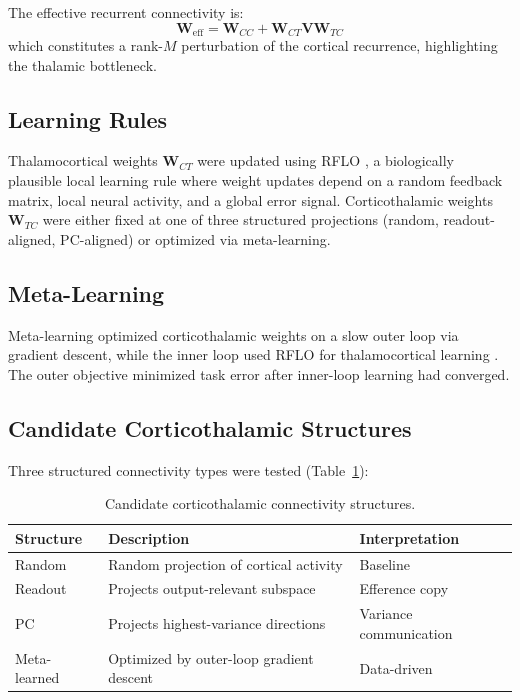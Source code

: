 \documentclass[11pt]{article}
\begin{document}
The effective recurrent connectivity is:
\begin{equation}
\mathbf{W}_{\text{eff}} = \mathbf{W}_{CC} + \mathbf{W}_{CT} \mathbf{V} \mathbf{W}_{TC}
\end{equation}
which constitutes a rank-$M$ perturbation of the cortical recurrence, highlighting the thalamic bottleneck.

\subsection{Learning Rules}

Thalamocortical weights $\mathbf{W}_{CT}$ were updated using RFLO \citep{lillicrap2016rflo}, a biologically plausible local learning rule where weight updates depend on a random feedback matrix, local neural activity, and a global error signal. Corticothalamic weights $\mathbf{W}_{TC}$ were either fixed at one of three structured projections (random, readout-aligned, PC-aligned) or optimized via meta-learning.

\subsection{Meta-Learning}

Meta-learning optimized corticothalamic weights on a slow outer loop via gradient descent, while the inner loop used RFLO for thalamocortical learning \citep{finn2021learning}. The outer objective minimized task error after inner-loop learning had converged.

\subsection{Candidate Corticothalamic Structures}

Three structured connectivity types were tested (Table~\ref{tab:structures}):

\begin{table}[htbp]
\centering
\caption{Candidate corticothalamic connectivity structures.}
\label{tab:structures}
\begin{tabular}{lll}
\toprule
\textbf{Structure} & \textbf{Description} & \textbf{Interpretation} \\
\midrule
Random & Random projection of cortical activity & Baseline \\
Readout & Projects output-relevant subspace & Efference copy \\
PC & Projects highest-variance directions & Variance communication \\
Meta-learned & Optimized by outer-loop gradient descent & Data-driven \\
\bottomrule
\end{tabular}
\end{table}
\end{document}
